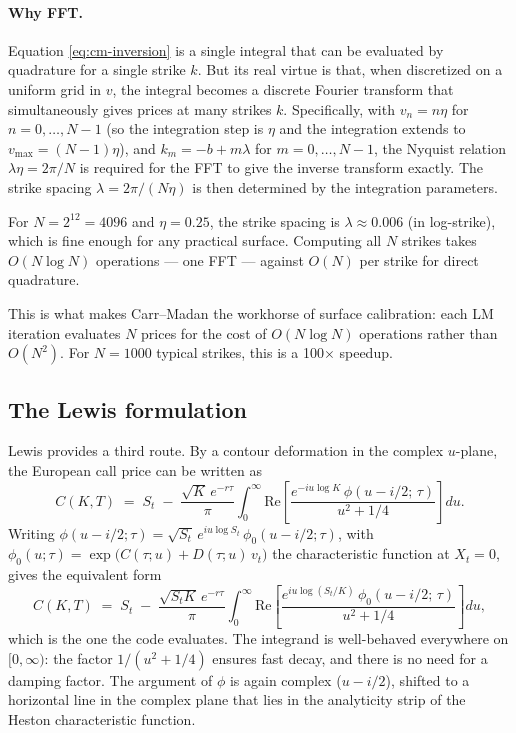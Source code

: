 \documentclass[11pt]{article}
\theoremstyle{plain}
\theoremstyle{definition}
\theoremstyle{remark}
\begin{document}
\paragraph{Why FFT.} Equation \eqref{eq:cm-inversion} is a single integral that can be evaluated by quadrature for a single strike \(k\). But its real virtue is that, when discretized on a uniform grid in \(v\), the integral becomes a discrete Fourier transform that simultaneously gives prices at many strikes \(k\). Specifically, with \(v_n = n \eta\) for \(n = 0, \ldots, N-1\) (so the integration step is \(\eta\) and the integration extends to \(v_{\max} = (N-1)\eta\)), and \(k_m = -b + m \lambda\) for \(m = 0, \ldots, N-1\), the Nyquist relation \(\lambda \eta = 2\pi/N\) is required for the FFT to give the inverse transform exactly. The strike spacing \(\lambda = 2\pi/(N\eta)\) is then determined by the integration parameters.

For \(N = 2^{12} = 4096\) and \(\eta = 0.25\), the strike spacing is \(\lambda \approx 0.006\) (in log-strike), which is fine enough for any practical surface. Computing all \(N\) strikes takes \(O(N \log N)\) operations --- one FFT --- against \(O(N)\) per strike for direct quadrature.

This is what makes Carr--Madan the workhorse of surface calibration: each LM iteration evaluates \(N\) prices for the cost of \(O(N \log N)\) operations rather than \(O(N^2)\). For \(N = 1000\) typical strikes, this is a 100\(\times\) speedup.

\subsection{The Lewis formulation}

Lewis \cite{Lewis2000} provides a third route. By a contour deformation in the complex \(u\)-plane, the European call price can be written as
\begin{equation}
    C(K, T) \;=\; S_t \;-\; \frac{\sqrt{K}\, e^{-r\tau}}{\pi} \int_0^\infty \mathrm{Re}\!\left[\frac{e^{-i u \log K}\,\phi\!\left(u - i/2;\, \tau\right)}{u^2 + 1/4}\right] du.                                                                  \label{eq:lewis-call}
\end{equation}
Writing \(\phi(u - i/2; \tau) = \sqrt{S_t}\, e^{i u \log S_t}\, \phi_0(u - i/2; \tau)\), with \(\phi_0(u; \tau) = \exp\bigl(C(\tau; u) + D(\tau; u)\, v_t\bigr)\) the characteristic function at \(X_t = 0\), gives the equivalent form
\[
    C(K, T) \;=\; S_t \;-\; \frac{\sqrt{S_t K}\, e^{-r\tau}}{\pi} \int_0^\infty \mathrm{Re}\!\left[\frac{e^{i u \log(S_t/K)}\,\phi_0\!\left(u - i/2;\, \tau\right)}{u^2 + 1/4}\right] du,
\]
which is the one the code evaluates.
The integrand is well-behaved everywhere on \([0, \infty)\): the factor \(1/(u^2 + 1/4)\) ensures fast decay, and there is no need for a damping factor. The argument of \(\phi\) is again complex (\(u - i/2\)), shifted to a horizontal line in the complex plane that lies in the analyticity strip of the Heston characteristic function.
\end{document}
